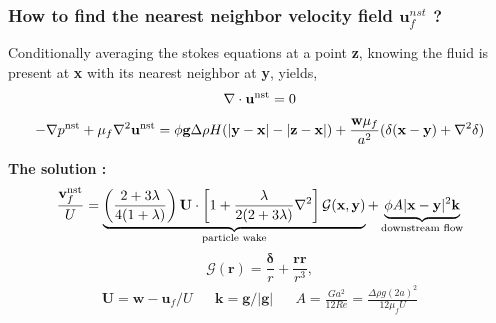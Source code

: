 \documentclass{sintefbeamer}
\begin{document}
\begin{frame}
  \frametitle{How to find the nearest neighbor velocity field $\textbf{u}_f^{nst}$ ? }

  Conditionally averaging the stokes equations at a point \textbf{z}, knowing the fluid is present at \textbf{x} with its nearest neighbor at \textbf{y}, yields, 
  \begin{equation*}
    \mathbf{\nabla} \cdot \textbf{u}^\text{nst}
    = 0
    \label{eq:mass_nst_d_stokes}
\end{equation*}
\begin{equation*}
    - \mathbf{\nabla} p^\text{nst} 
    + \mu_f \mathbf{\nabla}^2 \textbf{u}^\text{nst}
    = 
    \phi
    \textbf{g}
    \Delta\rho H(|\textbf{y} - \textbf{x}| - |\textbf{z} - \textbf{x}|)
    + \frac{\textbf{w} \mu_f}{a^2} (\delta(\textbf{x} - \textbf{y}) +\mathbf{\nabla}^2\delta)
    \label{eq:momentum_nst_d_stokes}
\end{equation*}

\textbf{The solution : } 
\begin{equation}
  \frac{\textbf{v}^\text{nst}_f}{U}
  =
  \underbrace{\left(\frac{2+3\lambda}{4(1+\lambda)}\right)\textbf{U}\cdot\left[
      1
      +
      \frac{\lambda}{2(2+3\lambda)}\mathbf{\nabla}^2 
  \right]\mathcal{G}(\textbf{x},\textbf{y})}_\text{particle wake}
  + \underbrace{\phi A |\textbf{x}-\textbf{y}|^2 \textbf{k}}_\text{downstream flow}
  \label{eq:v_nst_solution_adim}
\end{equation}
\begin{equation*}
  \mathcal{G}(\textbf{r})
  = \frac{\bm\delta}{r}
  + \frac{\textbf{rr}}{r^3},
\end{equation*}
\begin{align*}
  \textbf{U} = \textbf{w} - \textbf{u}_f/U
  && 
  \textbf{k} = \textbf{g}/|\textbf{g}|
  &&
  A = \frac{Ga^2}{12 Re}=\frac{\Delta \rho g (2a)^2}{12 \mu_f U}
  \label{eq:A_general}
\end{align*}
\end{frame}
\end{document}

